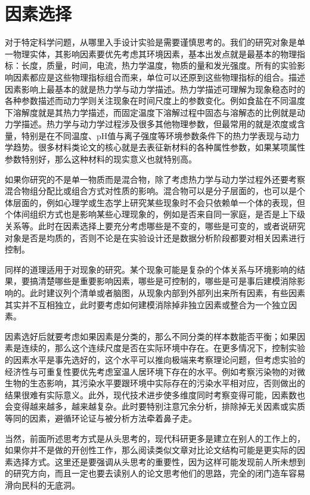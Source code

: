 \documentclass[]{tufte-book}
\begin{document}
\hypertarget{ux56e0ux7d20ux9009ux62e9}{%
\section{因素选择}\label{ux56e0ux7d20ux9009ux62e9}}

对于特定科学问题，从哪里入手设计实验是需要谨慎思考的。我们的研究对象是单一物理实体，其影响因素要优先考虑其环境因素，基本出发点就是最基本的物理指标：长度，质量，时间，电流，热力学温度，物质的量和发光强度。所有的实验影响因素都应是这些物理指标组合而来，单位可以还原到这些物理指标的组合。描述因素影响上最基本的就是热力学与动力学描述。热力学描述可理解为现象稳态时的各种参数描述而动力学则关注现象在时间尺度上的参数变化。例如食盐在不同温度下溶解度就是其热力学描述，而固定温度下溶解过程中固态与溶解态的比例就是动力学描述。热力学与动力学过程涉及很多其他物理参数，但最常用的就是浓度或含量，特别是在不同温度、pH值与离子强度等环境参数条件下的热力学表现与动力学趋势。很多材料类论文的核心就是去表征新材料的各种属性参数，如果某项属性参数特别好，那么这种材料的现实意义也就特别高。

如果你研究的不是单一物质而是混合物，除了考虑热力学与动力学过程外还要考察混合物组分配比或组合方式对性质的影响。混合物可以是分子层面的，也可以是个体层面的，例如心理学或生态学上研究某些现象时不会只依赖单一个体的表现，但个体间组织方式也是影响某些心理现象的，例如是否来自同一家庭，是否是上下级关系等。此时在因素选择上要充分考虑哪些是不变的，哪些是可变的，或者说研究对象是否是均质的，否则不论是在实验设计还是数据分析阶段都要对相关因素进行控制。

同样的道理适用于对现象的研究。某个现象可能是复杂的个体关系与环境影响的结果，要搞清楚哪些是重要影响因素，哪些是可控制的，哪些是可是事后建模消除影响的。此时建议列个清单或者脑图，从现象内部到外部列出来所有因素，有些因素其实并不互相独立，此时要考虑如何建模消除掉非独立因素或整合为一个独立因素。

因素选好后就要考虑如果因素是分类的，那么不同分类的样本数能否平衡；如果因素是连续的，那么这个连续尺度是否在实际环境中存在。在更多情况下，控制实验的因素水平是事先选好的，这个水平可以推向极端来考察理论问题，但考虑实验的经济性与可重复性要优先考虑室温人居环境下存在的水平。例如考察污染物的对微生物的生态影响，其污染水平要跟环境中实际存在的污染水平相对应，否则做出的结果很难有实际意义。此外，现代技术进步使多维度同时考察变得可能，因素数也会变得越来越多，越来越复杂。此时要特别注意冗余分析，排除掉无关因素或实质等同的因素，避循环论证与被分析方法牵着鼻子走。

当然，前面所述思考方式是从头思考的，现代科研更多是建立在别人的工作上的，如果你并不是做的开创性工作，那么阅读类似文章对比论文结构可能是更实际的因素选择方式。这里还是要强调从头思考的重要性，因为这样可能发现前人所未想到的研究方向，而且一定也要去读别人的论文思考他们的思路，完全的闭门造车容易滑向民科的无底洞。
\end{document}
